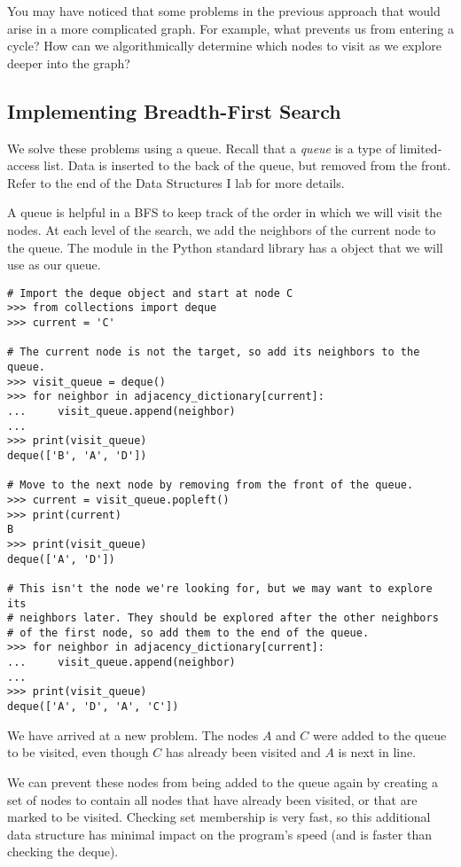You may have noticed that some problems in the previous approach that would arise in a more complicated graph.
For example, what prevents us from entering a cycle?
How can we algorithmically determine which nodes to visit as we explore deeper into the graph?

\subsection*{Implementing Breadth-First Search}

We solve these problems using a queue.
Recall that a \emph{queue} is a type of limited-access list.
Data is inserted to the back of the queue, but removed from the front.
Refer to the end of the Data Structures I lab for more details.

A queue is helpful in a BFS to keep track of the order in which we will visit the nodes.
At each level of the search, we add the neighbors of the current node to the queue.
The  module in the Python standard library has a  object that we will use as our queue.

\begin{lstlisting}
# Import the deque object and start at node C
>>> from collections import deque
>>> current = 'C'

# The current node is not the target, so add its neighbors to the queue.
>>> visit_queue = deque()
>>> for neighbor in adjacency_dictionary[current]:
...     visit_queue.append(neighbor)
...
>>> print(visit_queue)
deque(['B', 'A', 'D'])

# Move to the next node by removing from the front of the queue.
>>> current = visit_queue.popleft()
>>> print(current)
B
>>> print(visit_queue)
deque(['A', 'D'])

# This isn't the node we're looking for, but we may want to explore its
# neighbors later. They should be explored after the other neighbors
# of the first node, so add them to the end of the queue.
>>> for neighbor in adjacency_dictionary[current]:
...     visit_queue.append(neighbor)
...
>>> print(visit_queue)
deque(['A', 'D', 'A', 'C'])
\end{lstlisting}

We have arrived at a new problem.
The nodes $A$ and $C$ were added to the queue to be visited, even though $C$ has already been visited and $A$ is next in line.

We can prevent these nodes from being added to the queue again by creating a set of nodes to contain all nodes that have already been visited, or that are marked to be visited.
Checking set membership is very fast, so this additional data structure has minimal impact on the program's speed (and is faster than checking the deque).

